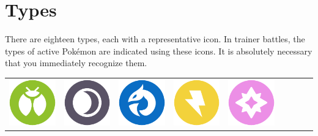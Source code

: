 \chapter{Types\label{chap:types}}
\nopagecolor{}There are eighteen types, each with a representative icon.
In trainer battles, the types of active Pokémon are indicated
 using these icons.
It is absolutely necessary that you immediately recognize them.

\begin{table}[ht!]
\centering
\begin{tabular}{c c c c c c c c c}
\includegraphics[scale=.25]{images/bug.png} &
\includegraphics[scale=.25]{images/dark.png} &
\includegraphics[scale=.25]{images/dragon.png} &
\includegraphics[scale=.25]{images/electric.png} &
\includegraphics[scale=.25]{images/fairy.png} &

\end{tabular}
\end{table}
